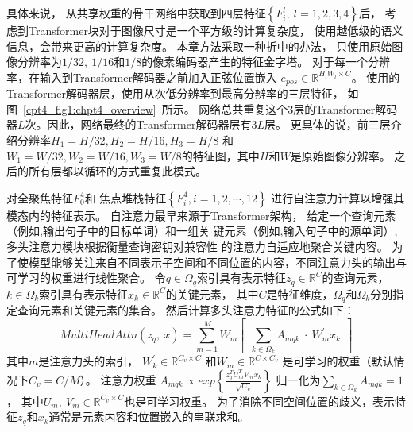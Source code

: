具体来说，
从共享权重的骨干网络中获取到四层特征$\left \{ F_{i}^{l},~l=1,2,3,4 \right \}$后，
考虑到Transformer块对于图像尺寸是一个平方级的计算复杂度，
使用越低级的语义信息，会带来更高的计算复杂度。
本章方法采取一种折中的办法，
只使用原始图像分辨率为$1/32,~1/16$和$1/8$的像素编码器产生的特征金字塔。
对于每一个分辨率，在输入到Transformer解码器之前加入正弦位置嵌入
$ e_{pos}\in \mathbb{R}^{H_{l}W_{l}\times C} $。
使用的Transformer解码器层，使用从次低分辨率到最高分辨率的三层特征，
如图~\ref{cpt4_fig1:chpt4_overview}~所示。
网络总共重复这个3层的Transformer解码器$L$次。因此，网络最终的Transformer解码器层有$3L$层。
更具体的说，前三层介绍分辨率$H_{1}=H/32,H_{2}=H/16,H_{3}=H/8$
和$W_{1}=W/32,W_{2}=W/16,W_{3}=W/8$的特征图，其中$H$和$W$是原始图像分辨率。
之后的所有层都以循环的方式重复此模式。



对全聚焦特征$ F_{0}^{4} $和
焦点堆栈特征$ \left \{ F_{i}^{4}, i=1,2, \cdots, 12 \right \}$
进行自注意力计算以增强其模态内的特征表示。
自注意力最早来源于Transformer架构，
给定一个查询元素（例如,输出句子中的目标单词）和一组关
键元素（例如,输入句子中的源单词）,多头注意力模块根据衡量查询密钥对兼容性
的注意力自适应地聚合关键内容。
为了使模型能够关注来自不同表示子空间和不同位置的内容，不同注意力头的输出与可学习的权重进行线性聚合。
%
%
%
%
%
%
%
%
%
令$q\in \Omega_{q}$索引具有表示特征$z_{q} \in \mathbb{R}^{C}$的查询元素，
$k\in \Omega_{k}$索引具有表示特征$x_{k} \in \mathbb{R}^{C}$的关键元素，
其中$C$是特征维度，$\Omega_{q}$和$\Omega_{k}$分别指定查询元素和关键元素的集合。
然后计算多头注意力特征的公式如下：
% 
% 
% 
% 
\begin{equation}
	MultiHeadAttn(z_{q},~x)=\sum_{m=1}^{M}
	W_{m}\left [ ~~\sum_{k\in \Omega_{k}}^{}A_{mqk} ~\cdot~ W_{m}^{'} x_{k}  ~~\right ]  
\end{equation}
% 
% 
% 
% 
其中$m$是注意力头的索引，
$ W_{k}^{{}' } \in \mathbb{R}^{C_{v} \times C} $
和$W_{m} \in \mathbb{R}^{C\times C_{v} }$
是可学习的权重（默认情况下$C_{v}=C/M$）。
注意力权重 
$A_{mqk} \propto exp \left \{ 
\frac{
	z_{q}^{T} U_{m}^{T} V_{m} x_{k}
}{ \sqrt{C_{v}}
}  \right \} $
% 
% 
% 
归一化为$ {\textstyle \sum_{k\in\Omega_{k}}^{}} A_{mqk} = 1$，
其中$U_{m},~V_{m} \in \mathbb{R}^{C_{v}\times C}$也是可学习权重。
为了消除不同空间位置的歧义，表示特征$z_{q}$和$x_{k}$通常是元素内容和位置嵌入的串联求和。





